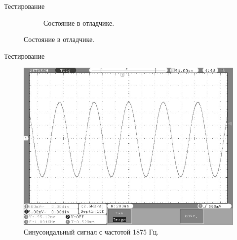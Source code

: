 \documentclass[10pt]{beamer}
\begin{document}
\begin{frame}{Тестирование}
\begin{figure}
\begin{subfigure}[H]{0.45\textwidth}
         \caption*{Состояние в отладчике.}
     \end{subfigure}
\end{figure}
\end{frame}

\begin{frame}{Тестирование}
  \begin{figure}
  \includegraphics[width=1\textwidth]{1875}
  \caption*{Синусоидальный сигнал с частотой 1875 Гц.}
  \end{figure}
\end{frame}
\end{document}
